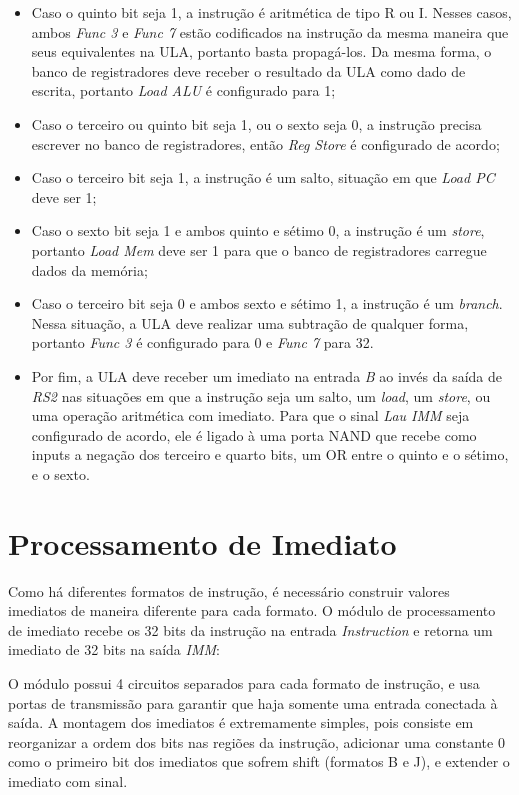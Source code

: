 \documentclass[twocolumn]{article}
\newcommand{\circuit}[1]{}
\begin{document}
\begin{itemize}
\item Caso o quinto bit seja 1, a instrução é aritmética de tipo R ou I. Nesses
  casos, ambos \textit{Func 3} e \textit{Func 7} estão codificados na instrução
  da mesma maneira que seus equivalentes na ULA, portanto basta
  propagá-los. Da mesma forma, o banco de registradores deve receber o resultado
  da ULA como dado de escrita, portanto \textit{Load ALU} é configurado para 1;
\item Caso o terceiro ou quinto bit seja 1, ou o sexto seja 0, a instrução
  precisa escrever no banco de registradores, então \textit{Reg Store} é
  configurado de acordo;
\item Caso o terceiro bit seja 1, a instrução é um salto, situação em que
  \textit{Load PC} deve ser 1;
\item Caso o sexto bit seja 1 e ambos quinto e sétimo 0, a instrução é um
  \textit{store}, portanto \textit{Load Mem} deve ser 1 para que o banco de
  registradores carregue dados da memória;
\item Caso o terceiro bit seja 0 e ambos sexto e sétimo 1, a instrução é um
  \textit{branch}. Nessa situação, a ULA deve realizar uma subtração de qualquer
  forma, portanto \textit{Func 3} é configurado para 0 e \textit{Func 7} para
  32.
\item Por fim, a ULA deve receber um imediato na entrada \textit{B} ao invés da
  saída de \textit{RS2} nas situações em que a instrução seja um salto, um
  \textit{load}, um \textit{store}, ou uma operação aritmética com
  imediato. Para que o sinal \textit{Lau IMM} seja configurado de acordo, ele é
  ligado à uma porta NAND que recebe como inputs a negação dos terceiro e quarto
  bits, um OR entre o quinto e o sétimo, e o sexto.
\end{itemize}

\section{Processamento de Imediato}

Como há diferentes formatos de instrução, é necessário construir valores
imediatos de maneira diferente para cada formato. O módulo de processamento de
imediato recebe os 32 bits da instrução na entrada \textit{Instruction} e
retorna um imediato de 32 bits na saída \textit{IMM}:

\circuit{imm-proc}

O módulo possui 4 circuitos separados para cada formato de instrução, e usa
portas de transmissão para garantir que haja somente uma entrada conectada à
saída. A montagem dos imediatos é extremamente simples, pois consiste em
reorganizar a ordem dos bits nas regiões da instrução, adicionar uma constante 0
como o primeiro bit dos imediatos que sofrem shift (formatos B e J), e extender
o imediato com sinal.
\end{document}

